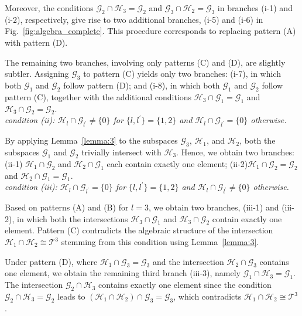 \documentclass[aps,showpacs,amsmath,amssymb,twocolumn,prx,longbibliography,superscriptaddress,notitlepage,floatfix,10pt]{revtex4-2}
\begin{document}
Moreover, the conditions $\mathcal{G}_{2}\cap\mathcal{H}_{3}=\mathcal{G}_{2}$ and $\mathcal{G}_{3}\cap\mathcal{H}_{2}=\mathcal{G}_{3}$ in branches (i-1) and (i-2), respectively, give rise to two additional branches, (i-5) and (i-6) in Fig.~\ref{fig:algebra_complete}. This procedure corresponds to replacing pattern (A) with pattern (D).

The remaining two branches, involving only patterns (C) and (D), are slightly subtler. 
Assigning $\mathcal{G}_{3}$ to pattern (C) yields only two branches: (i-7), in which both $\mathcal{G}_{1}$ and $\mathcal{G}_{2}$ follow pattern (D); and (i-8), in which both $\mathcal{G}_{1}$ and $\mathcal{G}_{2}$ follow pattern (C), together with the additional conditions $\mathcal{H}_{3}\cap\mathcal{G}_{1}=\mathcal{G}_{1}$ and $\mathcal{H}_{3}\cap\mathcal{G}_{2}=\mathcal{G}_{2}$.\\


{\it condition (ii): $\mathcal{H}_{l}\cap\mathcal{G}_{l^{\prime}}\not=\{0\}$ for $\{l,l^{\prime}\}=\{1,2\}$ and $\mathcal{H}_{l}\cap\mathcal{G}_{l^{\prime}}=\{0\}$ otherwise.}

By applying Lemma~\ref{lemma:3} to the subspaces $\mathcal{G}_{3}$, $\mathcal{H}_{1}$, and $\mathcal{H}_{2}$, both the subspaces $\mathcal{G}_{1}$ and $\mathcal{G}_{2}$ trivially intersect with $\mathcal{H}_{3}$. Hence, we obtain two branches: (ii-1) $\mathcal{H}_{1}\cap\mathcal{G}_{2}$ and $\mathcal{H}_{2}\cap\mathcal{G}_{1}$ each contain exactly one element; (ii-2)$\mathcal{H}_{1}\cap\mathcal{G}_{2}=\mathcal{G}_{2}$ and $\mathcal{H}_{2}\cap\mathcal{G}_{1}=\mathcal{G}_{1}$. \\

{\it condition (iii): $\mathcal{H}_{l}\cap\mathcal{G}_{l^{\prime}}=\{0\}$ for $\{l,l^{\prime}\}=\{1,2\}$ and $\mathcal{H}_{l}\cap\mathcal{G}_{l^{\prime}}\not=\{0\}$ otherwise.}

Based on patterns (A) and (B) for $l=3$, we obtain two branches, (iii-1) and (iii-2), in which both the intersections $\mathcal{H}_{3}\cap\mathcal{G}_{1}$ and $\mathcal{H}_{3}\cap\mathcal{G}_{2}$ contain exactly one element. Pattern (C) contradicts the algebraic structure of the intersection $\mathcal{H}_{1}\cap\mathcal{H}_{2}\cong \mathcal{T}^{3}$ stemming from this condition using Lemma~\ref{lemma:3}.

Under pattern (D), where $\mathcal{H}_{1} \cap \mathcal{G}_{3} = \mathcal{G}_{3}$ and the intersection $\mathcal{H}_{2} \cap \mathcal{G}_{3}$ contains one element, we obtain the remaining third branch (iii-3), namely $\mathcal{G}_{1} \cap \mathcal{H}_{3}=\mathcal{G}_{1}$. The intersection $\mathcal{G}_{2} \cap \mathcal{H}_{3}$ contains exactly one element since the condition $\mathcal{G}_{2} \cap \mathcal{H}_{3} = \mathcal{G}_{2}$ leads to $(\mathcal{H}_{1} \cap \mathcal{H}_{2})\cap\mathcal{G}_{3} = \mathcal{G}_{3}$, which contradicts $\mathcal{H}_{1} \cap \mathcal{H}_{2}\cong \mathcal{T}^{3}$.
\end{document}
